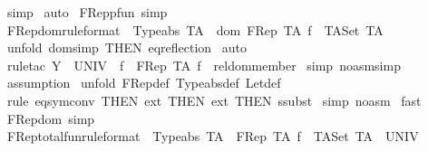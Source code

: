 \begin{isabellebody}
\isamarkupfalse%
\ simp\isanewline
{}\isamarkupfalse%
\ auto\isanewline
{}\isamarkupfalse%
%
\endisatagproof
{\isafoldproof}%
%
\isadelimproof
\isanewline
%
\endisadelimproof
\isanewline
{}\isamarkupfalse%
\ FRep{\isacharunderscore}pfun\ {\isacharbrackleft}simp{\isacharbrackright}\isanewline
\isanewline
{}\isamarkupfalse%
\ FRep{\isacharunderscore}dom{\isacharbrackleft}rule{\isacharunderscore}format{\isacharbrackright}\ {\isacharcolon}\ {\isachardoublequoteopen}Typeabs\ TA\ {\isacharminus}{\isacharminus}{\isachargreater}\ dom\ {\isacharparenleft}FRep\ TA\ f{\isacharparenright}\ {\isacharequal}\ TASet\ TA{\isachardoublequoteclose}\isanewline
%
\isadelimproof
%
\endisadelimproof
%
\isatagproof
{}\isamarkupfalse%
\ {\isacharparenleft}unfold\ dom{\isacharunderscore}simp\ {\isacharbrackleft}THEN\ eq{\isacharunderscore}reflection{\isacharbrackright}{\isacharparenright}\isanewline
{}\isamarkupfalse%
\ auto\isanewline
{}\isamarkupfalse%
\ {\isacharparenleft}rule{\isacharunderscore}tac\ Y\ {\isacharequal}\ {\isachardoublequoteopen}UNIV{\isachardoublequoteclose}\ \ f\ {\isacharequal}\ {\isachardoublequoteopen}FRep\ TA\ f{\isachardoublequoteclose}\ \ rel{\isacharunderscore}dom{\isacharunderscore}member{\isacharparenright}\isanewline
{}\isamarkupfalse%
\ {\isacharparenleft}simp\ {\isacharparenleft}no{\isacharunderscore}asm{\isacharunderscore}simp{\isacharparenright}{\isacharparenright}\isanewline
{}\isamarkupfalse%
\ assumption\isanewline
{}\isamarkupfalse%
\ {\isacharparenleft}unfold\ FRep{\isacharunderscore}def\ Typeabs{\isacharunderscore}def\ Let{\isacharunderscore}def{\isacharparenright}\isanewline
\isanewline
{}\isamarkupfalse%
\ {\isacharparenleft}rule\ eq{\isacharunderscore}sym{\isacharunderscore}conv\ {\isacharbrackleft}THEN\ ext{\isacharcomma}\ THEN\ ext{\isacharcomma}\ THEN\ ssubst{\isacharbrackright}{\isacharparenright}\isanewline
{}\isamarkupfalse%
\ {\isacharparenleft}simp\ {\isacharparenleft}no{\isacharunderscore}asm{\isacharparenright}{\isacharparenright}\isanewline
{}\isamarkupfalse%
\ fast\isanewline
{}\isamarkupfalse%
%
\endisatagproof
{\isafoldproof}%
%
\isadelimproof
\isanewline
%
\endisadelimproof
\isanewline
{}\isamarkupfalse%
\ FRep{\isacharunderscore}dom\ {\isacharbrackleft}simp{\isacharbrackright}\isanewline
\isanewline
{}\isamarkupfalse%
\ FRep{\isacharunderscore}total{\isacharunderscore}fun{\isacharbrackleft}rule{\isacharunderscore}format{\isacharbrackright}\ {\isacharcolon}\ {\isachardoublequoteopen}Typeabs\ TA\ {\isacharminus}{\isacharminus}{\isachargreater}\ {\isacharparenleft}FRep\ TA\ f{\isacharparenright}\ {\isacharcolon}\ {\isacharparenleft}{\isacharparenleft}TASet\ TA{\isacharparenright}\ {\isacharminus}{\isacharminus}{\isacharminus}{\isachargreater}\ UNIV{\isacharparenright}{\isachardoublequoteclose}\isanewline

\end{isabellebody}
